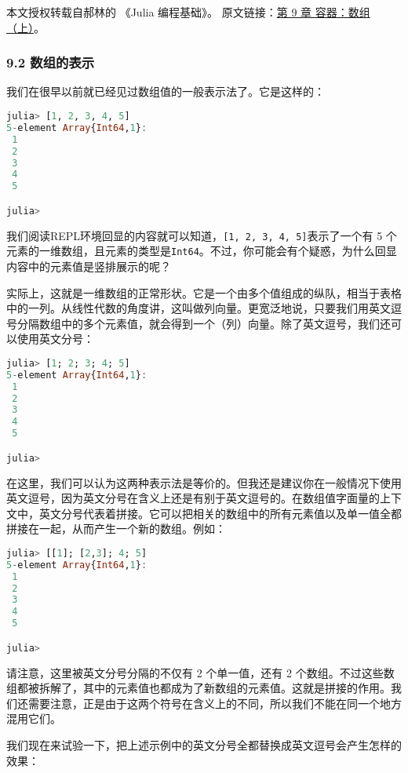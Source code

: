 
本文授权转载自郝林的 《Julia 编程基础》。 原文链接：\href{https://github.com/hyper0x/JuliaBasics/blob/master/book/ch09.md}{第 9 章 容器：数组（上）}。


\subsubsection{9.2 数组的表示}

我们在很早以前就已经见过数组值的一般表示法了。它是这样的：

\begin{lstlisting}[language=julia]
julia> [1, 2, 3, 4, 5]
5-element Array{Int64,1}:
 1
 2
 3
 4
 5

julia> 
\end{lstlisting}

我们阅读REPL环境回显的内容就可以知道，\verb`[1, 2, 3, 4, 5]`表示了一个有 5 个元素的一维数组，且元素的类型是\verb`Int64`。不过，你可能会有个疑惑，为什么回显内容中的元素值是竖排展示的呢？

实际上，这就是一维数组的正常形状。它是一个由多个值组成的纵队，相当于表格中的一列。从线性代数的角度讲，这叫做列向量。更宽泛地说，只要我们用英文逗号分隔数组中的多个元素值，就会得到一个（列）向量。除了英文逗号，我们还可以使用英文分号：

\begin{lstlisting}[language=julia]
julia> [1; 2; 3; 4; 5]
5-element Array{Int64,1}:
 1
 2
 3
 4
 5

julia> 
\end{lstlisting}

在这里，我们可以认为这两种表示法是等价的。但我还是建议你在一般情况下使用英文逗号，因为英文分号在含义上还是有别于英文逗号的。在数组值字面量的上下文中，英文分号代表着拼接。它可以把相关的数组中的所有元素值以及单一值全都拼接在一起，从而产生一个新的数组。例如：

\begin{lstlisting}[language=julia]
julia> [[1]; [2,3]; 4; 5]
5-element Array{Int64,1}:
 1
 2
 3
 4
 5

julia>
\end{lstlisting}

请注意，这里被英文分号分隔的不仅有 2 个单一值，还有 2 个数组。不过这些数组都被拆解了，其中的元素值也都成为了新数组的元素值。这就是拼接的作用。我们还需要注意，正是由于这两个符号在含义上的不同，所以我们不能在同一个地方混用它们。

我们现在来试验一下，把上述示例中的英文分号全都替换成英文逗号会产生怎样的效果：

